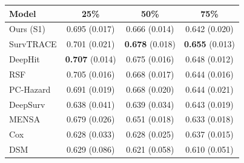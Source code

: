 \begin{tabular}{lccc}
\toprule
Model & 25\% & 50\% & 75\% \\
\midrule
Ours (S1) & 0.695 (0.017) & 0.666 (0.014) & 0.642 (0.020) \\
SurvTRACE & 0.701 (0.021) & \textbf{0.678} (0.018) & \textbf{0.655} (0.013) \\
DeepHit & \textbf{0.707} (0.014) & 0.675 (0.016) & 0.648 (0.012) \\
RSF & 0.705 (0.016) & 0.668 (0.017) & 0.644 (0.016) \\
PC-Hazard & 0.691 (0.019) & 0.668 (0.020) & 0.644 (0.021) \\
DeepSurv & 0.638 (0.041) & 0.639 (0.034) & 0.643 (0.019) \\
MENSA & 0.679 (0.026) & 0.651 (0.018) & 0.633 (0.018) \\
Cox & 0.628 (0.033) & 0.628 (0.025) & 0.637 (0.015) \\
DSM & 0.629 (0.086) & 0.621 (0.058) & 0.610 (0.051) \\
\bottomrule
\end{tabular}
